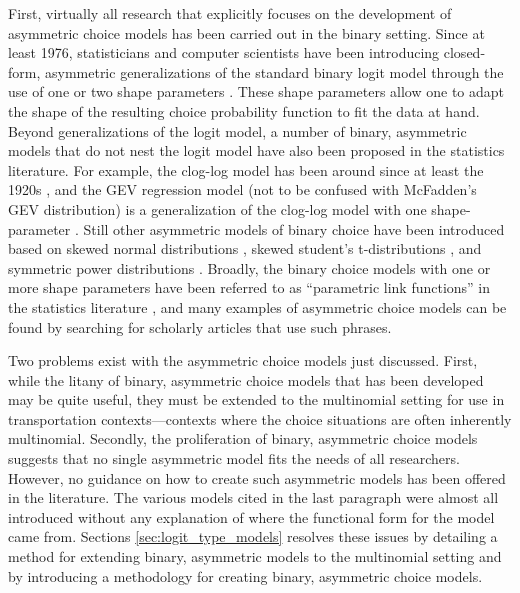 First, virtually all research that explicitly focuses on the development of asymmetric choice models has been carried out in the binary setting. Since at least 1976, statisticians and computer scientists have been introducing closed-form, asymmetric generalizations of the standard binary logit model through the use of one or two shape parameters \citep{prentice_generalization_1976, pregibon_goodness_1980, aranda-ordaz_two_1981, guerrero_use_1982, stukel_generalized_1988, morgan_extended_1988, czado_link_1992, czado_parametric_1994, nagler_scobit:_1994, chen_new_1999, vijverberg_betit:_2000, masnadi-shirazi_variable_2010, vijverberg_pregibit:_2012, nakayama_unified_2015, komori_asymmetric_2015}. These shape parameters allow one to adapt the shape of the resulting choice probability function to fit the data at hand. Beyond generalizations of the logit model, a number of binary, asymmetric models that do not nest the logit model have also been proposed in the statistics literature. For example, the clog-log model has been around since at least the 1920s \citep{fisher_mathematical_1922, yates_use_1955, mccullagh_generalized_1989}, and the GEV regression model (not to be confused with McFadden's GEV distribution) is a generalization of the clog-log model with one shape-parameter \citep{wang_generalized_2010, calabrese_modelling_2013}. Still other asymmetric models of binary choice have been introduced based on skewed normal distributions \citep{bazan_framework_2010}, skewed student's t-distributions \citep{kim_binary_2002, kim_flexible_2008}, and symmetric power distributions \citep{jiang_new_2013}. Broadly, the binary choice models with one or more shape parameters have been referred to as ``parametric link functions'' in the statistics literature \citep{mccullagh_generalized_1989}, and many examples of asymmetric choice models can be found by searching for scholarly articles that use such phrases.

Two problems exist with the asymmetric choice models just discussed. First, while the litany of binary, asymmetric choice models that has been developed may be quite useful, they must be extended to the multinomial setting for use in transportation contexts---contexts where the choice situations are often inherently multinomial. Secondly, the proliferation of binary, asymmetric choice models suggests that no single asymmetric model fits the needs of all researchers. However, no guidance on how to create such asymmetric models has been offered in the literature. The various models cited in the last paragraph were almost all introduced without any explanation of where the functional form for the model came from. Sections \ref{sec:logit_type_models} resolves these issues by detailing a method for extending binary, asymmetric models to the multinomial setting and by introducing a methodology for creating binary, asymmetric choice models.

